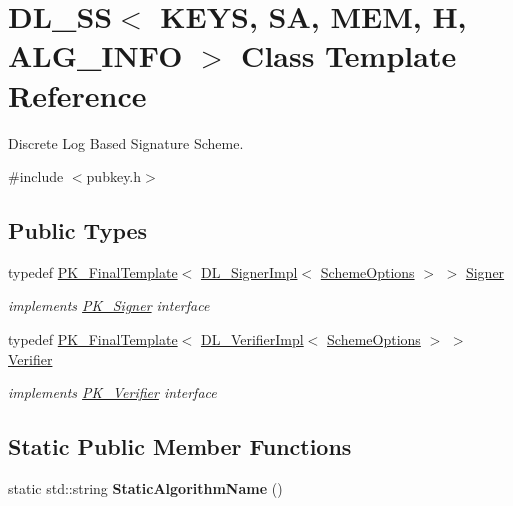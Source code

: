 \hypertarget{class_d_l___s_s}{
\section{DL\_\-SS$<$ KEYS, SA, MEM, H, ALG\_\-INFO $>$ Class Template Reference}
\label{class_d_l___s_s}
}


Discrete Log Based Signature Scheme.  


{\ttfamily \#include $<$pubkey.h$>$}\subsection*{Public Types}
\begin{DoxyCompactItemize}
\item 
\hypertarget{class_d_l___s_s_a06e7b984899bf56fbd09e62315339c67}{
typedef \hyperlink{class_p_k___final_template}{PK\_\-FinalTemplate}$<$ \hyperlink{class_d_l___signer_impl}{DL\_\-SignerImpl}$<$ \hyperlink{struct_d_l___signature_scheme_options}{SchemeOptions} $>$ $>$ \hyperlink{class_d_l___s_s_a06e7b984899bf56fbd09e62315339c67}{Signer}}
\label{class_d_l___s_s_a06e7b984899bf56fbd09e62315339c67}

\begin{DoxyCompactList}\small\item\em implements \hyperlink{class_p_k___signer}{PK\_\-Signer} interface \item\end{DoxyCompactList}\item 
\hypertarget{class_d_l___s_s_a82b5f64ffa8f0ebb04743a074e3d201a}{
typedef \hyperlink{class_p_k___final_template}{PK\_\-FinalTemplate}$<$ \hyperlink{class_d_l___verifier_impl}{DL\_\-VerifierImpl}$<$ \hyperlink{struct_d_l___signature_scheme_options}{SchemeOptions} $>$ $>$ \hyperlink{class_d_l___s_s_a82b5f64ffa8f0ebb04743a074e3d201a}{Verifier}}
\label{class_d_l___s_s_a82b5f64ffa8f0ebb04743a074e3d201a}

\begin{DoxyCompactList}\small\item\em implements \hyperlink{class_p_k___verifier}{PK\_\-Verifier} interface \item\end{DoxyCompactList}\end{DoxyCompactItemize}
\subsection*{Static Public Member Functions}
\begin{DoxyCompactItemize}
\item 
\hypertarget{class_d_l___s_s_a5142247cb5e028814e84f0c464e98783}{
static std::string {\bfseries StaticAlgorithmName} ()}
\label{class_d_l___s_s_a5142247cb5e028814e84f0c464e98783}

\end{DoxyCompactItemize}


